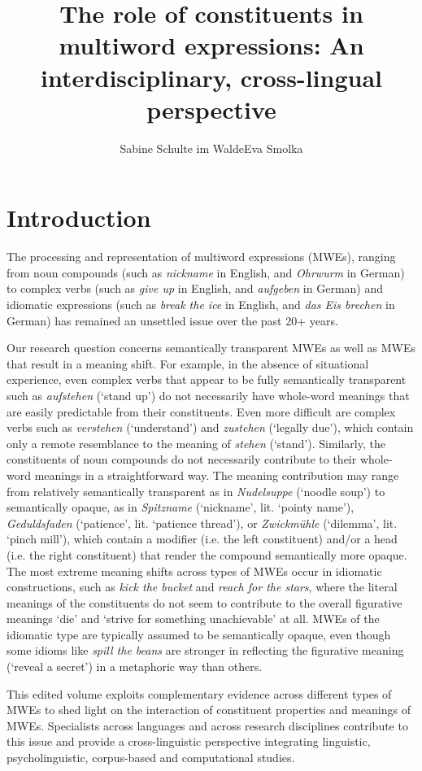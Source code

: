 \documentclass[output=paper]{langsci/langscibook}
\title{The role of constituents in multiword expressions: An interdisciplinary, cross-lingual perspective}
\author{Sabine Schulte im Walde\affiliation{Institut für Maschinelle Sprachverarbeitung, Universität Stuttgart}\lastand  Eva Smolka\affiliation{Fachbereich Linguistik, Universität Konstanz}}
\begin{document}
\section{Introduction}

The processing and representation of multiword expressions (MWEs),
ranging from noun compounds (such as \textit{nickname} in English, and
\textit{Ohrwurm} in German) to complex verbs (such as \textit{give up}
in English, and \textit{aufgeben} in German) and idiomatic expressions
(such as \textit{break the ice} in English, and \textit{das Eis
  brechen} in German) has remained an unsettled issue over the past
20+ years.

Our research question concerns semantically transparent MWEs as well as MWEs that result in a meaning
shift. For example, in the absence of situational experience, even
complex verbs that appear to be fully semantically transparent such as
\textit{aufstehen} (`stand up') do not necessarily have whole-word
meanings that are easily predictable from their constituents. Even
more difficult are complex verbs such as \textit{verstehen}
(`understand') and \textit{zustehen} (`legally due'), which contain
only a remote resemblance to the meaning of \textit{stehen}
(`stand'). Similarly, the constituents of noun compounds do not
necessarily contribute to their whole-word meanings in a
straightforward way. The meaning contribution may range from
relatively semantically transparent as in \textit{Nudelsuppe}
(`noodle soup') to semantically opaque, as in \textit{Spitzname}
(`nickname', lit. `pointy name'), \textit{Geduldsfaden} (`patience', lit. `patience thread'), or  \textit{Zwickmühle} (`dilemma',
lit. `pinch mill'), which contain a modifier (i.e. the left
constituent) and/or a head (i.e. the right constituent) that render the
compound semantically more opaque.  The most extreme meaning shifts
across types of MWEs occur in idiomatic constructions, such as
\textit{kick the bucket} and \textit{reach for the stars}, where the
literal meanings of the constituents do not seem to contribute to the
overall figurative meanings `die' and `strive for something
unachievable' at all. MWEs of the idiomatic type are typically assumed
to be semantically opaque, even though some idioms like \textit{spill
  the beans} are stronger in reflecting the figurative meaning
(`reveal a secret') in a metaphoric way than others.

This edited volume exploits complementary evidence across different
types of MWEs to shed light on the interaction of constituent
properties and meanings of MWEs. Specialists across languages and
across research disciplines contribute to this issue and provide a
cross-linguistic perspective integrating linguistic, psycholinguistic,
corpus-based and computational studies.
\end{document}
